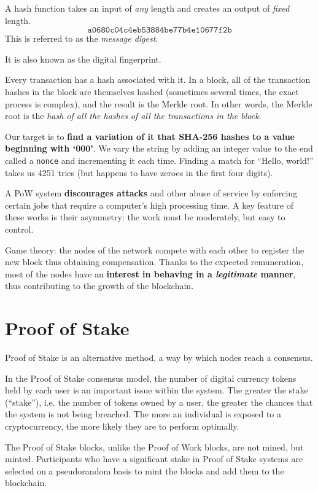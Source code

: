 A hash function takes an input of \textit{any} length and creates an output of \textit{fixed} length. 
\begin{equation*}
	\texttt{a0680c04c4eb53884be77b4e10677f2b}
\end{equation*}
This is referred to as the \textit{message digest}.

It is also known as the digital fingerprint.

Every transaction has a hash associated with it. In a block, all of the transaction hashes in the block are themselves hashed (sometimes several times, the exact process is complex), and the result is the Merkle root. In other words, the Merkle root is the \textit{hash of all the hashes of all the transactions in the block}. 

Our target is to \textbf{find a variation of it that SHA-256 hashes to a value beginning with `000'}. We vary the string by adding an integer value to the end called a \texttt{nonce} and incrementing it each time. Finding a match for ``Hello, world!'' takes us 4251 tries (but happens to have zeroes in the first four digits).

A PoW system \textbf{discourages attacks} and other abuse of service by enforcing certain jobs that require a computer's high processing time. A key feature of these works is their asymmetry: the work must be moderately, but easy to control.

Game theory: the nodes of the network compete with each other to register the new block thus obtaining compensation. Thanks to the expected remuneration, most of the nodes have an \textbf{interest in behaving in a \emph{legitimate} manner}, thus contributing to the growth of the blockchain.

\section{Proof of Stake}

Proof of Stake is an alternative method, a way by which nodes reach a consensus.

In the Proof of Stake consensus model, the number of digital currency tokens held by each user is an important issue within the system. The greater the stake (``stake''), i.e. the number of tokens owned by a user, the greater the chances that the system is not being breached. The more an individual is exposed to a cryptocurrency, the more likely they are to perform optimally.

The Proof of Stake blocks, unlike the Proof of Work blocks, are not mined, but minted. Participants who have a significant stake in Proof of Stake systems are selected on a pseudorandom basis to mint the blocks and add them to the blockchain.


